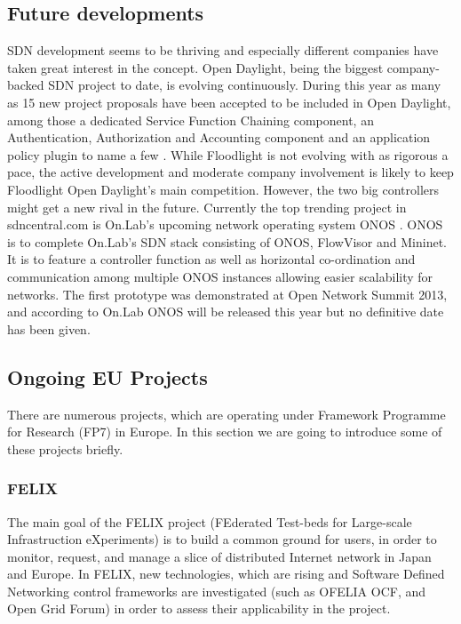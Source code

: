 \subsection{Future developments}

SDN development seems to be thriving and especially different companies have taken great interest in the concept. Open Daylight, being the biggest company-backed SDN project to date, is evolving continuously. During this year as many as 15 new project proposals have been accepted to be included in Open Daylight, among those a dedicated Service Function Chaining component, an Authentication, Authorization and Accounting component and an application policy plugin to name a few \cite{projects}. While Floodlight is not evolving with as rigorous a pace, the active development and moderate company involvement is likely to keep Floodlight Open Daylight's main competition. However, the two big controllers might get a new rival in the future. Currently the top trending project in sdncentral.com is On.Lab's upcoming network operating system ONOS \cite{SDNCentral, ONOS}. ONOS is to complete On.Lab's SDN stack consisting of ONOS, FlowVisor and Mininet. It is to feature a controller function as well as horizontal co-ordination and communication among multiple ONOS instances allowing easier scalability for networks. The first prototype was demonstrated at Open Network Summit 2013, and according to On.Lab ONOS will be released this year but no definitive date has been given.

\subsection{Ongoing EU Projects}

There are numerous projects, which are operating under Framework Programme for Research (FP7) in Europe. In this section we are going to introduce some of these projects briefly. 

\subsubsection{FELIX}

The main goal of the FELIX project (FEderated Test-beds for Large-scale Infrastruction eXperiments) is to build a common ground for users, in order to monitor, request, and manage a slice of distributed Internet network in Japan and Europe. In FELIX, new technologies, which are rising and Software Defined Networking control frameworks are investigated (such as OFELIA OCF, and Open Grid Forum) in order to assess their applicability in the project. \cite{FELIXproject}

